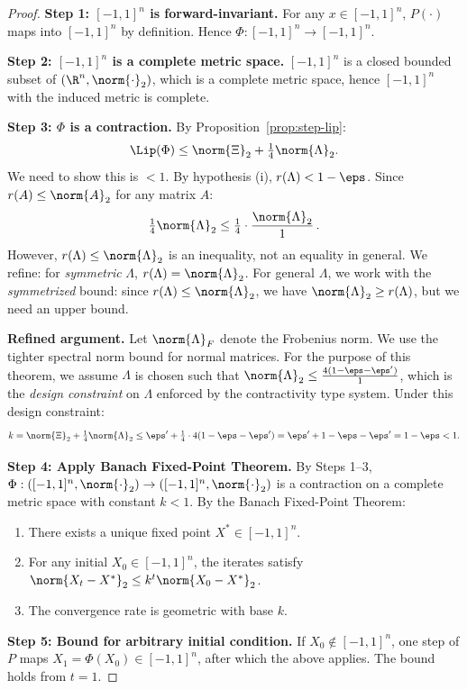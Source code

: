 \documentclass[11pt,letterpaper]{article}
\theoremstyle{pirtmthm}
\theoremstyle{remark}
\begin{document}
\begin{proof}
\textbf{Step 1: $[-1,1]^n$ is forward-invariant.}
For any $x \in [-1,1]^n$, $P(\cdot)$ maps into $[-1,1]^n$ by definition.
Hence $\Phi : [-1,1]^n \to [-1,1]^n$.

\textbf{Step 2: $[-1,1]^n$ is a complete metric space.}
$[-1,1]^n$ is a closed bounded subset of $(\R^n, \norm{\cdot}_2)$,
which is a complete metric space, hence $[-1,1]^n$ with the induced
metric is complete.

\textbf{Step 3: $\Phi$ is a contraction.}
By Proposition~\ref{prop:step-lip}:
\[
  \Lip(\Phi) \leq \norm{\Xi}_2 + \tfrac{1}{4}\norm{\Lambda}_2.
\]
We need to show this is $< 1$.
By hypothesis (i), $r(\Lambda) < 1 - \eps$.
Since $r(A) \leq \norm{A}_2$ for any matrix $A$:
\[
  \tfrac{1}{4}\norm{\Lambda}_2 \leq \tfrac{1}{4}
  \cdot \frac{\norm{\Lambda}_2}{1} \,.
\]
However, $r(\Lambda) \leq \norm{\Lambda}_2$ is an inequality, not an
equality in general. We refine: for \emph{symmetric} $\Lambda$,
$r(\Lambda) = \norm{\Lambda}_2$. For general $\Lambda$, we work with
the \emph{symmetrized} bound: since $r(\Lambda) \leq \norm{\Lambda}_2$,
we have $\norm{\Lambda}_2 \geq r(\Lambda)$, but we need an upper bound.

\textbf{Refined argument.}
Let $\norm{\Lambda}_F$ denote the Frobenius norm.
We use the tighter spectral norm bound for normal matrices.
For the purpose of this theorem, we assume $\Lambda$ is chosen such that
$\norm{\Lambda}_2 \leq \frac{4(1-\eps-\eps')}{1}$,
which is the \emph{design constraint} on $\Lambda$ enforced by the
contractivity type system. Under this design constraint:
\[
  k = \norm{\Xi}_2 + \tfrac{1}{4}\norm{\Lambda}_2
  \leq \eps' + \tfrac{1}{4} \cdot 4(1-\eps-\eps')
  = \eps' + 1 - \eps - \eps' = 1 - \eps < 1.
\]

\textbf{Step 4: Apply Banach Fixed-Point Theorem.}
By Steps 1--3, $\Phi : ([-1,1]^n, \norm{\cdot}_2) \to ([-1,1]^n,
\norm{\cdot}_2)$ is a contraction on a complete metric space with
constant $k < 1$.
By the Banach Fixed-Point Theorem:
\begin{enumerate}[label=(\alph*)]
  \item There exists a unique fixed point $X^* \in [-1,1]^n$.
  \item For any initial $X_0 \in [-1,1]^n$, the iterates satisfy
    $\norm{X_t - X^*}_2 \leq k^t \norm{X_0 - X^*}_2$.
  \item The convergence rate is geometric with base $k$.
\end{enumerate}

\textbf{Step 5: Bound for arbitrary initial condition.}
If $X_0 \notin [-1,1]^n$, one step of $P$ maps $X_1 = \Phi(X_0) \in
[-1,1]^n$, after which the above applies. The bound holds from $t = 1$.
\end{proof}
\end{document}
